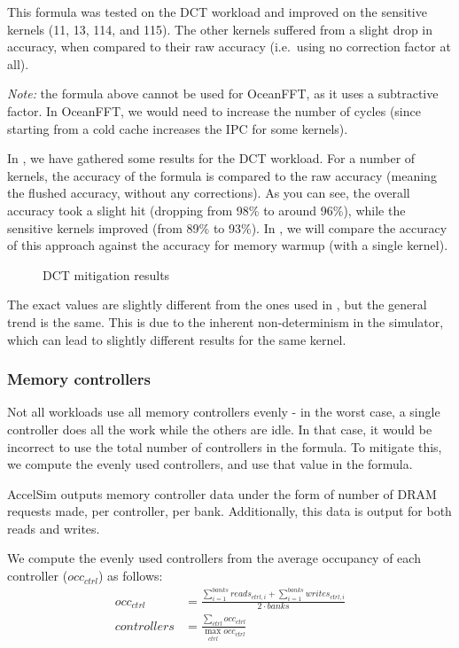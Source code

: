 This formula was tested on the DCT workload and improved on the sensitive kernels (11, 13, 114, and 115).
The other kernels suffered from a slight drop in accuracy, when compared to their raw accuracy (i.e.\ using no correction factor at all).

\textit{Note:} the formula above cannot be used for OceanFFT, as it uses a subtractive factor.
In OceanFFT, we would need to increase the number of cycles (since starting from a cold cache increases the IPC for some kernels).

In , we have gathered some results for the DCT workload.
For a number of kernels, the accuracy of the formula is compared to the raw accuracy (meaning the flushed accuracy, without any corrections).
As you can see, the overall accuracy took a slight hit (dropping from 98\% to around 96\%), while the sensitive kernels improved (from 89\% to 93\%).
In , we will compare the accuracy of this approach against the accuracy for memory warmup (with a single kernel).

\begin{figure}[h]
    \centering
    \caption{DCT mitigation results}
    \label{fig:dct-mitig}
\end{figure}

The exact values are slightly different from the ones used in , but the general trend is the same.
This is due to the inherent non-determinism in the simulator, which can lead to slightly different results for the same kernel.

\subsubsection{Memory controllers}\label{subsubsec:mem-ctrl}
Not all workloads use all memory controllers evenly - in the worst case, a single controller does all the work while the others are idle.
In that case, it would be incorrect to use the total number of controllers in the formula.
To mitigate this, we compute the evenly used controllers, and use that value in the formula.

AccelSim outputs memory controller data under the form of number of DRAM requests made, per controller, per bank.
Additionally, this data is output for both reads and writes.

We compute the evenly used controllers from the average occupancy of each controller ($occ_{ctrl}$) as follows:
\begin{align}
    occ_{ctrl} &= \frac{\sum_{i = 1}^{banks}{reads_{ctrl, i}} + \sum_{i = 1}^{banks}{writes_{ctrl, i}}}{2 \cdot banks} \\
    controllers &= \frac{\sum_{ctrl}{occ_{ctrl}}}{\max_{ctrl}{occ_{ctrl}}}
\end{align}


